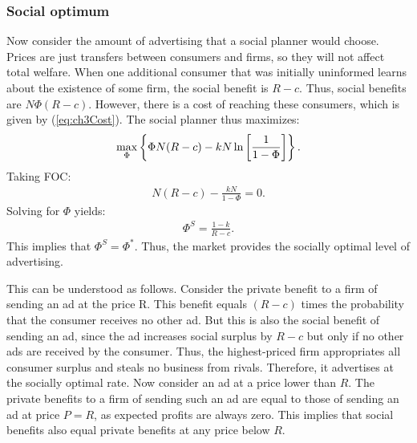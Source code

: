 \subsubsection{Social optimum}
Now consider the amount of advertising that a social planner would choose. Prices are just transfers between consumers and firms, so they will
not affect total welfare. When one additional consumer that was initially uninformed learns about the existence of some firm, the social
benefit is $R-c$. Thus, social benefits are $N\Phi(R-c)$. However, there is a cost of reaching these consumers, which is given by (\ref{eq:ch3Cost}).
The social planner thus maximizes:
\begin{align}
	\underset{\Phi}{\max}\left\{\Phi N(R-c)-kN\,\mathrm{ln}\left[\frac{1}{1-\Phi}\right] \right\}.
\end{align}
Taking FOC:
\begin{align}
	N(R-c)-\frac{kN}{1-\Phi}=0.
\end{align}
Solving for $\Phi$ yields:
\begin{align}
	\Phi^S=\frac{1-k}{R-c}.
\end{align}
This implies that $\Phi^S=\Phi^*$. Thus, the market provides the socially optimal level of advertising.

This can be understood as follows. Consider the private benefit to a firm of sending
an ad at the price R. This benefit equals $(R-c)$ times the probability that the consumer
receives no other ad. But this is also the social benefit of sending an ad, since the ad
increases social surplus by $R-c$ but only if no other ads are received by the consumer.
Thus, the highest-priced firm appropriates all consumer surplus and steals no business
from rivals. Therefore, it advertises at the socially optimal rate. Now consider an ad at
a price lower than $R$. The private benefits to a firm of sending such an ad are equal to
those of sending an ad at price $P = R$, as expected profits are always zero. This implies
that social benefits also equal private benefits at any price below $R$.
